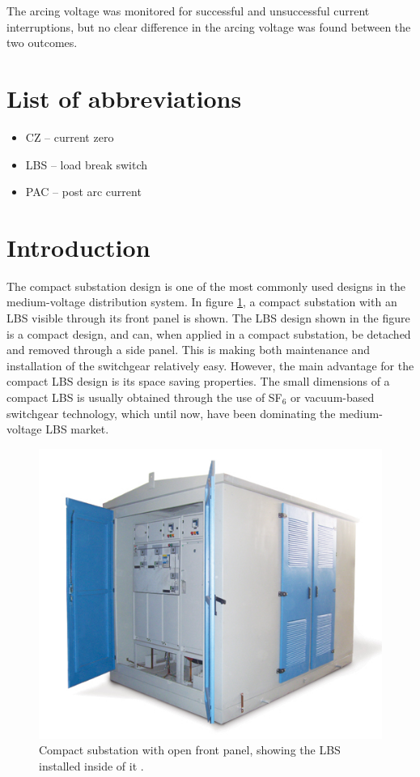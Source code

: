 \documentclass[10pt,b5paper,twoside]{article}
\begin{document}
The arcing voltage was monitored for successful and unsuccessful current interruptions, but no clear difference in the arcing voltage was found between the two outcomes.

\cleardoublepage
\setcounter{page}{1}
\tableofcontents

\cleardoublepage
\section{List of abbreviations}
\begin{itemize}
\item CZ -- current zero
\item LBS -- load break switch
\item PAC -- post arc current
\end{itemize}

\cleardoublepage
\section{Introduction}
The compact substation design is one of the most commonly used designs in the medium-voltage distribution system. In figure \ref{fig:compactSubstation}, a compact substation with an LBS visible through its front panel is shown. The LBS design shown in the figure is a compact design, and can, when applied in a compact substation, be detached and removed through a side panel. This is making both maintenance and installation of the switchgear relatively easy. However, the main advantage for the compact LBS design is its space saving properties. The small dimensions of a compact LBS is usually obtained through the use of SF$_6$ or vacuum-based switchgear technology, which until now, have been dominating the medium-voltage LBS market.

\begin{figure} [h]
\centering
\includegraphics[scale=0.5]{Bilder/Introduction/general_substation.jpg}
\caption{Compact substation with open front panel, showing the LBS installed inside of it \cite{bib:comSub}.} \label{fig:compactSubstation}
\end{figure}
\end{document}
